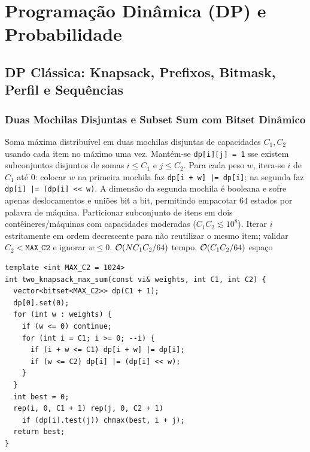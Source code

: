 \section{Programação Dinâmica (DP) e Probabilidade}

\subsection{DP Clássica: Knapsack, Prefixos, Bitmask, Perfil e Sequências}

\subsubsection{Duas Mochilas Disjuntas e Subset Sum com Bitset Dinâmico}
\algobox
  {Soma máxima distribuível em duas mochilas disjuntas de capacidades $C_1, C_2$ usando cada item no máximo uma vez.}
  {Mantém-se \texttt{dp[i][j] = 1} sse existem subconjuntos disjuntos de somas $i \le C_1$ e $j \le C_2$. Para cada peso $w$, itera-se $i$ de $C_1$ até $0$: colocar $w$ na primeira mochila faz \texttt{dp[i + w] |= dp[i]}; na segunda faz \texttt{dp[i] |= (dp[i] << w)}.}
  {A dimensão da segunda mochila é booleana e sofre apenas deslocamentos e uniões bit a bit, permitindo empacotar $64$ estados por palavra de máquina.}
  {Particionar subconjunto de itens em dois contêineres/máquinas com capacidades moderadas ($C_1 C_2 \lesssim 10^8$).}
  {Iterar $i$ estritamente em ordem decrescente para não reutilizar o mesmo item; validar $C_2 < \texttt{MAX\_C2}$ e ignorar $w \le 0$.}
  {$\mathcal{O}(N C_1 C_2 / 64)$ tempo, $\mathcal{O}(C_1 C_2 / 64)$ espaço}

\begin{lstlisting}
template <int MAX_C2 = 1024>
int two_knapsack_max_sum(const vi& weights, int C1, int C2) {
  vector<bitset<MAX_C2>> dp(C1 + 1);
  dp[0].set(0);
  for (int w : weights) {
    if (w <= 0) continue;
    for (int i = C1; i >= 0; --i) {
      if (i + w <= C1) dp[i + w] |= dp[i];
      if (w <= C2) dp[i] |= (dp[i] << w);
    }
  }
  int best = 0;
  rep(i, 0, C1 + 1) rep(j, 0, C2 + 1)
    if (dp[i].test(j)) chmax(best, i + j);
  return best;
}
\end{lstlisting}

